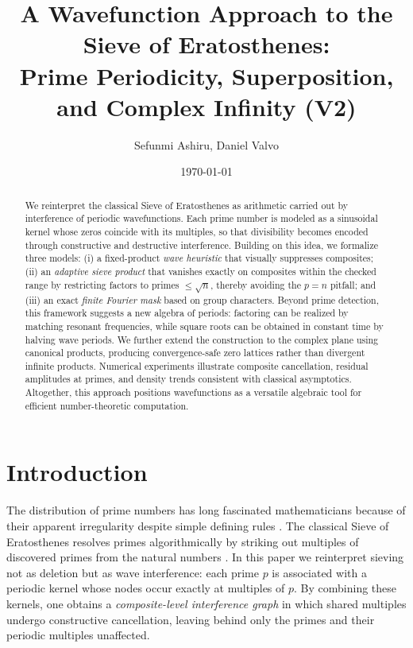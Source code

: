 \documentclass[12pt]{article}
\title{A Wavefunction Approach to the Sieve of Eratosthenes:\\
Prime Periodicity, Superposition, and Complex Infinity (V2)}
\author{Sefunmi Ashiru, Daniel Valvo}
\date{\today}
\theoremstyle{definition}
\theoremstyle{remark}
\begin{document}
\maketitle

\begin{abstract}
We reinterpret the classical Sieve of Eratosthenes as arithmetic carried out by interference of periodic wavefunctions. Each prime number is modeled as a sinusoidal kernel whose zeros coincide with its multiples, so that divisibility becomes encoded through constructive and destructive interference. Building on this idea, we formalize three models: (i) a fixed-product \emph{wave heuristic} that visually suppresses composites; (ii) an \emph{adaptive sieve product} that vanishes exactly on composites within the checked range by restricting factors to primes $\le \sqrt{n}$, thereby avoiding the $p=n$ pitfall; and (iii) an exact \emph{finite Fourier mask} based on group characters. Beyond prime detection, this framework suggests a new algebra of periods: factoring can be realized by matching resonant frequencies, while square roots can be obtained in constant time by halving wave periods. We further extend the construction to the complex plane using canonical products, producing convergence-safe zero lattices rather than divergent infinite products. Numerical experiments illustrate composite cancellation, residual amplitudes at primes, and density trends consistent with classical asymptotics. Altogether, this approach positions wavefunctions as a versatile algebraic tool for efficient number-theoretic computation.
\end{abstract}

\tableofcontents
\newpage

\section{Introduction}

The distribution of prime numbers has long fascinated mathematicians because of their apparent irregularity despite simple defining rules \citep{hardy2008introduction,ribenboim1991book}. 
The classical Sieve of Eratosthenes resolves primes algorithmically by striking out multiples of discovered primes from the natural numbers \citep{grantham2000eratosthenes}. 
In this paper we reinterpret sieving not as deletion but as wave interference: each prime \(p\) is associated with a periodic kernel whose nodes occur exactly at multiples of \(p\). 
By combining these kernels, one obtains a \emph{composite-level interference graph} in which shared multiples undergo constructive cancellation, leaving behind only the primes and their periodic multiples unaffected.
\end{document}

